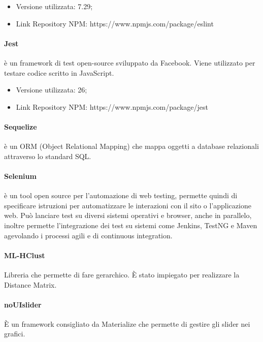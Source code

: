 \documentclass[../manuale_sviluppatore.tex]{subfiles}
\begin{document}
\begin{itemize}
    \item Versione utilizzata: 7.29;
    \item Link Repository NPM: https://www.npmjs.com/package/eslint 
\end{itemize}

\paragraph{Jest}
 è un framework di test open-source sviluppato da Facebook. Viene utilizzato per testare codice scritto in JavaScript. 
\begin{itemize}
    \item Versione utilizzata: 26;
    \item Link Repository NPM: https://www.npmjs.com/package/jest 
\end{itemize}

\paragraph{Sequelize}
 è un ORM (Object Relational Mapping) che mappa oggetti a database relazionali attraverso lo standard SQL.

\paragraph{Selenium}
 è un tool open source per l'automazione di web testing, permette quindi di specificare istruzioni per automatizzare le interazioni con il sito o l’applicazione web. 
Può lanciare test su diversi sistemi operativi e browser, anche in parallelo, inoltre permette l’integrazione dei test su sistemi come Jenkins, TestNG e Maven agevolando i processi agili e di continuous integration.

\paragraph{ML-HClust}
Libreria che permette di fare  gerarchico. È stato impiegato per realizzare la Distance Matrix.

\paragraph{noUIslider}
È un framework consigliato da Materialize che permette di gestire gli slider nei grafici. 
\end{document}
